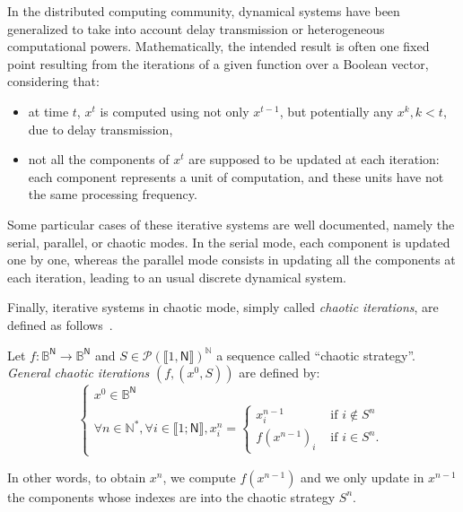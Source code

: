 In the distributed computing community, dynamical systems have been
generalized to take into account delay transmission or heterogeneous
computational powers. Mathematically, the intended result is often one 
fixed point resulting from the iterations of a given function over a
Boolean vector, considering that:
\begin{itemize}
\item at time $t$, $x^{t}$ is computed using not only $x^{t-1}$, but 
potentially any $x^{k}, k<t$, due to delay transmission,
\item not all the components of $x^{t}$ are supposed to be updated at
each iteration: each component represents a unit of computation, and 
these units have not the same processing frequency.
\end{itemize} 
Some particular cases of these iterative systems are well documented,
namely the serial, parallel, or chaotic modes.
In the serial mode, each component is updated one by one, whereas the
parallel mode consists in updating all the components at each iteration,
leading to an usual discrete dynamical system.

Finally, iterative systems in chaotic mode, simply called \emph{chaotic iterations},
are defined as follows~\cite{Robert1986}.
 

\begin{definition}
\label{defIC}
Let $f: \mathds{B}^\mathsf{N} \longrightarrow \mathds{B}^\mathsf{N}$ and 
$S \in \mathcal{P} \left(\llbracket1,\mathsf{N}\rrbracket\right)^\mathds{N}$
a sequence called ``chaotic strategy''. 
\emph{General chaotic iterations} $(f, (x^0, S))$ are defined by:
$$\left\{
\begin{array}{l}
x^0 \in \mathds{B}^\mathsf{N} \\
\forall n \in \mathds{N}^*, \forall i \in \llbracket 1; \mathsf{N} \rrbracket,  x^{n}_i = \left\{
\begin{array}{ll}
x^{n-1}_{i} & \textrm{ if } i \notin S^n\\
f(x^{n-1})_{i} & \textrm{ if } i \in S^n.
\end{array}
\right.
\end{array}
\right.$$
\end{definition}

In other words, to obtain $x^n$, we compute $f(x^{n-1})$ and we only update
in $x^{n-1}$ the components whose indexes are into the chaotic strategy $S^n$.

